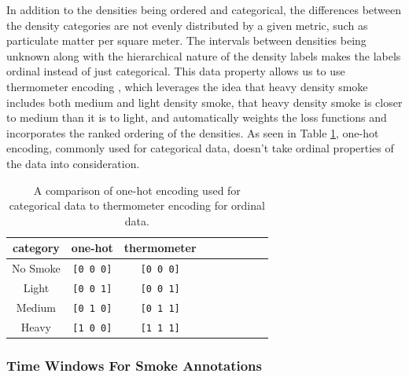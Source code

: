 \documentclass{article}
\begin{document}
In addition to the densities being ordered and categorical, the differences between the density categories are not evenly distributed by a given metric, such as particulate matter per square meter. The intervals between densities being unknown along with the hierarchical nature of the density labels makes the labels ordinal instead of just categorical. This data property allows us to use thermometer encoding \cite{therm_enc}, which leverages the idea that heavy density smoke includes both medium and light density smoke, that heavy density smoke is closer to medium than it is to light, and automatically weights the loss functions and incorporates the ranked ordering of the densities.  As seen in Table \ref{therm}, one-hot encoding, commonly used for categorical data, doesn't take ordinal properties of the data into consideration.  

\begin{table}[h] 
    \caption{A comparison of one-hot encoding used for categorical data to thermometer encoding for ordinal data.}\label{therm}
    \centering
    \begin{tabular}{ccccrrcrc}
        \toprule
        category & one-hot & thermometer \\
        \midrule
        No Smoke & \texttt{[0 0 0]} & \texttt{[0 0 0]} \\
        Light  & \texttt{[0 0 1]} & \texttt{[0 0 1]} \\
        Medium & \texttt{[0 1 0]} & \texttt{[0 1 1]} \\
        Heavy  & \texttt{[1 0 0]} & \texttt{[1 1 1]} \\
        \bottomrule
    \end{tabular}
\end{table}

\subsubsection*{Time Windows For Smoke Annotations}
\end{document}
